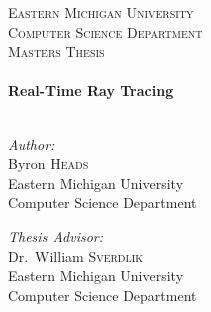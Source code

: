 
\begin{titlepage}
    \begin{center}
        \textsc{\large Eastern Michigan University}\\[1.5cm]
        \textsc{\large Computer Science Department}\\
        \textsc{\large Masters Thesis}\\[0.5cm]
        \HRule\\[0.4cm]
        { \huge \bfseries  Real-Time Ray Tracing }\\[0.4cm]
        \HRule\\[1.5cm]

        \begin{minipage}{0.45\textwidth}
            \begin{flushleft} \large
                \emph{Author:}\\
                Byron \textsc{Heads} \\
                \small Eastern Michigan University\\
                \small Computer Science Department \\
            \end{flushleft}
        \end{minipage}
        \begin{minipage}{0.45\textwidth}
            \begin{flushright} \large
                \emph{Thesis Advisor:} \\
                Dr.~William \textsc{Sverdlik}\\
                \small Eastern Michigan University\\
                \small Computer Science Department
            \end{flushright}
        \end{minipage}
        
        \vspace{10}
        

\end{center}
\end{titlepage}
